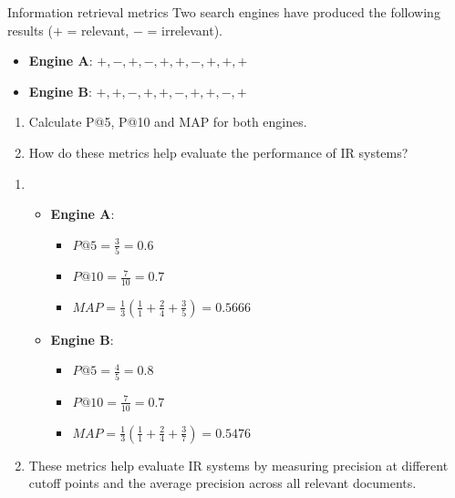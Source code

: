 \documentclass{article}
\begin{document}
\begin{exercise}{Information retrieval metrics}\label{ex:ir-metrics}
  Two search engines have produced the following results ($+$ = relevant, $-$ = irrelevant).
  \begin{itemize}
    \item \textbf{Engine A}: $+, -, +, -, +, +, -, +, +, +$
    \item \textbf{Engine B}: $+, +, -, +, +, -, +, +, -, +$
  \end{itemize}

  \begin{enumerate}
    \item Calculate P@5, P@10 and MAP for both engines.
    \item How do these metrics help evaluate the performance of IR systems?
  \end{enumerate}

  \begin{solution}
    \begin{enumerate}
      \item \begin{itemize}
          \item \textbf{Engine A}:
          \begin{itemize}
            \item $P@5 = \frac{3}{5} = 0.6$
            \item $P@10 = \frac{7}{10} = 0.7$
            \item $MAP = \frac{1}{3} \left( \frac{1}{1} + \frac{2}{4} + \frac{3}{5} \right) = 0.5666$
          \end{itemize}
          \item \textbf{Engine B}:
          \begin{itemize}
            \item $P@5 = \frac{4}{5} = 0.8$
            \item $P@10 = \frac{7}{10} = 0.7$
            \item $MAP = \frac{1}{3} \left( \frac{1}{1} + \frac{2}{4} + \frac{3}{7} \right) = 0.5476$
          \end{itemize}
        \end{itemize}
      \item These metrics help evaluate IR systems by measuring precision at different cutoff points and the average precision across all relevant documents.
    \end{enumerate}
  \end{solution}
\end{exercise}
\end{document}
